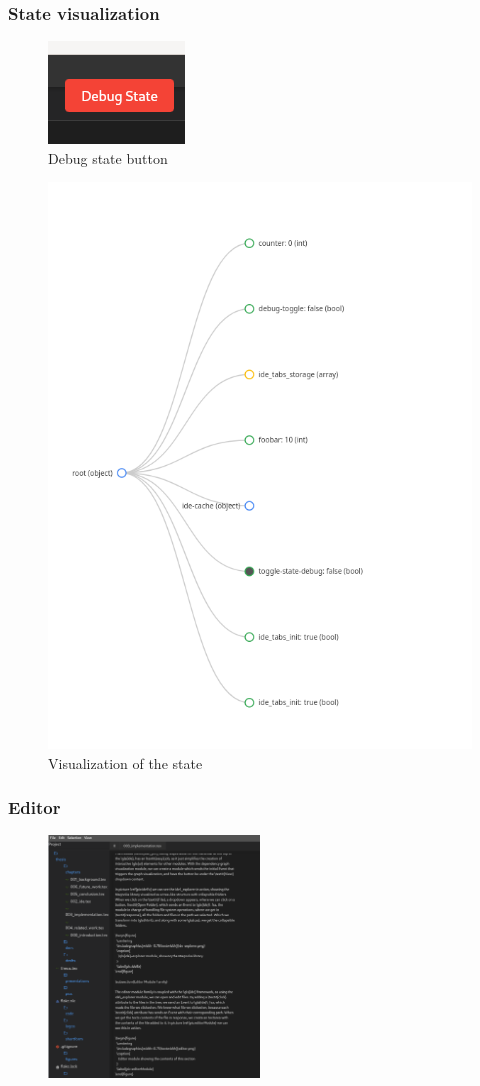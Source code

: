 \begin{frame}
  \frametitle{State visualization}
  \begin{figure}
    \centering
    \includegraphics[heigth=0.25\textwidth]{./pics/debug-state-btn.png}
    \caption{
      Debug state button
    }
  \end{figure}
  \begin{figure}
    \centering
    \includegraphics[height=0.5\textwidth]{./pics/debug-state.png}
    \caption{
      Visualization of the state
    }
  \end{figure}
\end{frame}

\begin{frame}
  \frametitle{Editor}
  \begin{figure}
    \centering
    \includegraphics[width=0.5\textwidth]{./pics/editor.png}
  \end{figure}
\end{frame}

